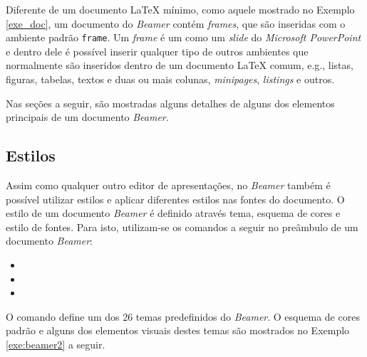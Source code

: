 Diferente de um documento \LaTeX{} mínimo, como aquele mostrado no Exemplo \ref{exe_doc}, um documento do \textit{Beamer} contém \textit{frames}, que são inseridas com o ambiente padrão {\tt frame}. Um \textit{frame} é um como um \textit{slide} do \textit{Microsoft PowerPoint} e dentro dele é possível inserir qualquer tipo de outros ambientes que normalmente são inseridos dentro de um documento \LaTeX{} comum, e.g., listas, figuras, tabelas, textos e duas ou mais colunas, \textit{minipages}, \textit{listings} e outros.

Nas seções a seguir, são mostradas alguns detalhes de alguns dos elementos principais de um documento \textit{Beamer}.

\subsection{Estilos}
\label{sec:estilos}

Assim como qualquer outro editor de apresentações, no \textit{Beamer} também é possível utilizar estilos e aplicar diferentes estilos nas fontes do documento. O estilo de um documento \textit{Beamer} é definido através tema, esquema de cores e estilo de fontes. Para isto, utilizam-se os comandos a seguir no preâmbulo de um documento \textit{Beamer}:

\begin{itemize}
    \item \texttt{\usetheme}
    \item \texttt{\setbeamercolor}
    \item \texttt{\usefonttheme}
\end{itemize}

O comando \texttt{\usetheme} define um dos 26 temas predefinidos do \textit{Beamer}. O esquema de cores padrão e alguns dos elementos visuais destes temas são mostrados no Exemplo \ref{exe:beamer2} a seguir.


